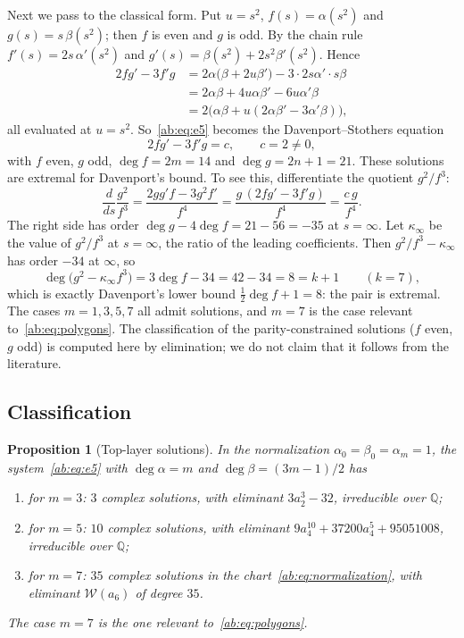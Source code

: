 \documentclass[a4paper,11pt]{article}
\theoremstyle{jsplain}
\newtheorem{proposition}[theorem]{Proposition}
\theoremstyle{jsdef}
\theoremstyle{jsrem}
\begin{document}
Next we pass to the classical form. Put $u=s^2$, $f(s)=\alpha(s^2)$ and $g(s)=s\,\beta(s^2)$; then $f$ is even and $g$ is odd. By the chain rule $f'(s)=2s\,\alpha'(s^2)$ and $g'(s)=\beta(s^2)+2s^2\beta'(s^2)$. Hence
\begin{align*}
2fg'-3f'g&=2\alpha\bigl(\beta+2u\beta'\bigr)-3\cdot2s\alpha'\cdot s\beta\\
&=2\alpha\beta+4u\alpha\beta'-6u\alpha'\beta\\
&=2\bigl(\alpha\beta+u(2\alpha\beta'-3\alpha'\beta)\bigr),
\end{align*}
all evaluated at $u=s^2$. So~\eqref{ab:eq:e5} becomes the Davenport--Stothers equation~\cite{Stothers,Davenport}
\begin{equation}
2fg'-3f'g=c,\qquad c=2\neq0,
\end{equation}
with $f$ even, $g$ odd, $\deg f=2m=14$ and $\deg g=2n+1=21$. These solutions are extremal for Davenport's bound. To see this, differentiate the quotient $g^2/f^3$:
\[
\frac{d}{ds}\frac{g^2}{f^3}=\frac{2gg'f-3g^2f'}{f^4}=\frac{g\,(2fg'-3f'g)}{f^4}=\frac{c\,g}{f^4}.
\]
The right side has order $\deg g-4\deg f=21-56=-35$ at $s=\infty$. Let $\kappa_\infty$ be the value of $g^2/f^3$ at $s=\infty$, the ratio of the leading coefficients. Then $g^2/f^3-\kappa_\infty$ has order $-34$ at $\infty$, so
\[
\deg\bigl(g^2-\kappa_\infty f^3\bigr)=3\deg f-34=42-34=8=k+1\qquad(k=7),
\]
which is exactly Davenport's lower bound $\tfrac12\deg f+1=8$: the pair is extremal. The cases $m=1,3,5,7$ all admit solutions, and $m=7$ is the case relevant to~\eqref{ab:eq:polygons}. The classification of the parity-constrained solutions ($f$ even, $g$ odd) is computed here by elimination; we do not claim that it follows from the literature.

\subsection{Classification}

\begin{proposition}[Top-layer solutions]\label{ab:prop:top-class}
In the normalization $\alpha_0=\beta_0=\alpha_m=1$, the system~\eqref{ab:eq:e5} with $\deg\alpha=m$ and $\deg\beta=(3m-1)/2$ has
\begin{enumerate}[nosep]
\item[(i)] for $m=3$: $3$ complex solutions, with eliminant $3a_2^3-32$, irreducible over $\mathbb{Q}$;
\item[(ii)] for $m=5$: $10$ complex solutions, with eliminant $9a_4^{10}+37200a_4^5+95051008$, irreducible over $\mathbb{Q}$;
\item[(iii)] for $m=7$: $35$ complex solutions in the chart~\eqref{ab:eq:normalization}, with eliminant $\mathcal{W}(a_6)$ of degree $35$.
\end{enumerate}
The case $m=7$ is the one relevant to~\eqref{ab:eq:polygons}.
\end{proposition}
\end{document}

